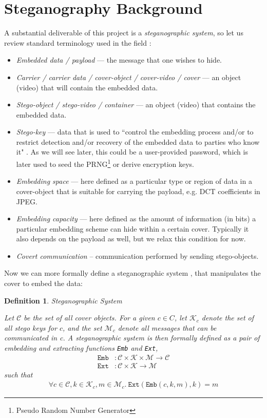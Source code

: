\documentclass[12pt,british,twoside,notitlepage,usenames,dvipsnames,hypens,final]{report}
\newtheorem{definition}{Definition}
\numberwithin{equation}{section}
\numberwithin{figure}{section}
\begin{document}
\section{Steganography Background}

A substantial deliverable of this project is a \emph{steganographic system}, so let us review standard terminology used in the field \cite{infohiding-survey, bateman}:
\begin{itemize}
\item \emph{Embedded data / payload} --- the message that one wishes to hide.
\item \emph{Carrier / carrier data / cover-object / cover-video / cover} --- an object (video) that will contain the embedded data.
\item \emph{Stego-object / stego-video / container } --- an object (video) that contains the embedded data.
\item \emph{Stego-key} ---  data that is used to ``control the embedding process and/or to restrict detection and/or recovery of the embedded data to parties who know it" \cite{infohiding-survey}. As we will see later, this could be a user-provided password, which is later used to seed the PRNG\footnote{Pseudo Random Number Generator} or derive encryption keys. 
\item \emph{Embedding space} --- here defined as a particular type or region of data in a cover-object that is suitable for carrying the payload, e.g. DCT coefficients in JPEG.
\item \emph{Embedding capacity} --- here defined as the amount of information (in bits) a particular embedding scheme can hide within a certain cover. Typically it also depends on the payload as well, but we relax this condition for now.
\item \emph{Covert communication} -- communication performed by sending stego-objects. 
\end{itemize}

Now we can more formally define a steganographic system \cite{scott-fs}, that manipulates the cover to embed the data:

\begin{definition}{Steganographic System}

Let $\mathcal{C}$ be the set of all cover objects. For a given $c \in C$, let $\mathcal{K}_c$ denote the set of all stego keys for $c$, and the set $\mathcal{M}_c$ denote all messages that can be communicated in c. A steganographic system is then formally defined as a pair of embedding and extracting functions \texttt{Emb} and \texttt{Ext},
\begin{align*}
\texttt{Emb} &: \mathcal{C} \times \mathcal{K} \times \mathcal{M} \rightarrow \mathcal{C} \\
\texttt{Ext} &: \mathcal{C} \times \mathcal{K} \rightarrow \mathcal{M}
\end{align*}
such that
\begin{align*}
\forall c \in \mathcal{C}, k \in \mathcal{K}_c, m \in \mathcal{M}_c . ~ \texttt{Ext}(\texttt{Emb}(c, k, m), k) = m
\end{align*}

\end{definition}
\end{document}
